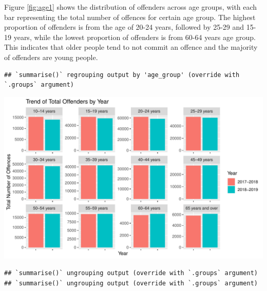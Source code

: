 \documentclass[11pt,a4paper,]{article}
\let\origfigure\figure
\let\endorigfigure\endfigure
\renewenvironment{figure}[1][2] {
\expandafter\origfigure\expandafter[H]
} {
\endorigfigure
}
\begin{document}
Figure \ref{fig:age1} shows the distribution of offenders across age groups, with each bar representing the total number of offences for certain age group. The highest proportion of offenders is from the age of 20-24 years, followed by 25-29 and 15-19 years, while the lowest proportion of offenders is from 60-64 years age group. This indicates that older people tend to not commit an offence and the majority of offenders are young people.

\begin{verbatim}
## `summarise()` regrouping output by 'age_group' (override with `.groups` argument)
\end{verbatim}

\begin{figure}
\centering
\includegraphics{ETC5513-Assignment4_files/figure-latex/age-yearly-changes-1.pdf}
\caption{\label{fig:age-yearly-changes}Distribution of total offenders yearly}
\end{figure}

\begin{verbatim}
## `summarise()` ungrouping output (override with `.groups` argument)
## `summarise()` ungrouping output (override with `.groups` argument)
\end{verbatim}
\end{document}
